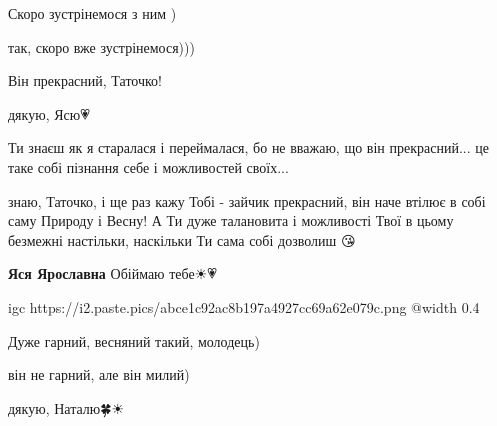  
 
 
 
 

\qqSecCmt


Скоро зустрінемося з ним )

\begin{itemize} %
так, скоро вже зустрінемося)))🙌😘
\end{itemize} %


Він прекрасний, Таточко! 👏🏻🐰✨

\begin{itemize} %

дякую, Ясю💗

Ти знаєш як я старалася і переймалася, бо не вважаю, що він прекрасний... це
таке собі пізнання себе і можливостей своїх...


знаю, Таточко, і ще раз кажу Тобі - зайчик прекрасний, він наче втілює в собі
саму Природу і Весну! А Ти дуже талановита і можливості Твої в цьому безмежні
настільки, наскільки Ти сама собі дозволиш 😘🙏🏼✨

\textbf{Яся Ярославна} Обіймаю тебе☀💗


\ifcmt
  igc https://i2.paste.pics/abce1c92ac8b197a4927cc69a62e079c.png
	@width 0.4
\fi

\end{itemize} %


Дуже гарний, весняний такий, молодець)

\begin{itemize} %

він не гарний, але він милий)

дякую, Наталю🍀☀🐰
\end{itemize} %

